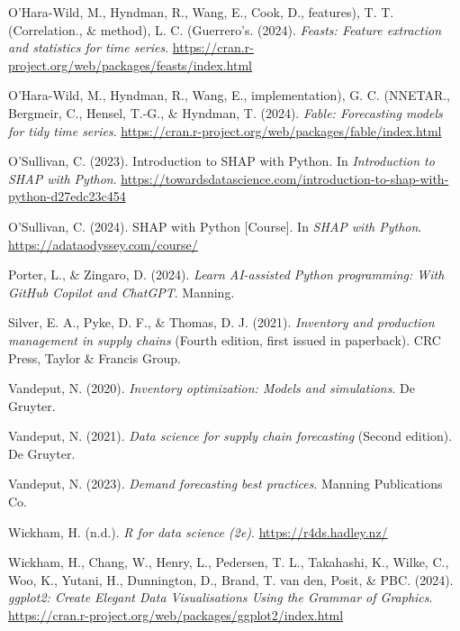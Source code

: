 \documentclass[
  american,
  10,
  a4paper,
]{book}
\newlength{\cslhangindent}
\newenvironment{CSLReferences}[2] %
 {\begin{list}{}{%
  \setlength{\itemindent}{0pt}
  \setlength{\leftmargin}{0pt}
  \setlength{\parsep}{0pt}
  \ifodd #1
   \setlength{\leftmargin}{\cslhangindent}
   \setlength{\itemindent}{-1\cslhangindent}
  \fi
  \setlength{\itemsep}{#2\baselineskip}}}
 {\end{list}}
\theoremstyle{definition}
\theoremstyle{remark}
\begin{document}
\begin{CSLReferences}{1}{0}
O'Hara-Wild, M., Hyndman, R., Wang, E., Cook, D., features), T. T.
(Correlation., \& method), L. C. (Guerrero's. (2024). \emph{Feasts:
Feature extraction and statistics for time series}.
\url{https://cran.r-project.org/web/packages/feasts/index.html}

O'Hara-Wild, M., Hyndman, R., Wang, E., implementation), G. C. (NNETAR.,
Bergmeir, C., Hensel, T.-G., \& Hyndman, T. (2024). \emph{Fable:
Forecasting models for tidy time series}.
\url{https://cran.r-project.org/web/packages/fable/index.html}

O'Sullivan, C. (2023). Introduction to {SHAP} with {Python}. In
\emph{Introduction to SHAP with Python}.
\url{https://towardsdatascience.com/introduction-to-shap-with-python-d27edc23c454}

O'Sullivan, C. (2024). {SHAP} with {Python} {[}Course{]}. In \emph{SHAP
with Python}. \url{https://adataodyssey.com/course/}

Porter, L., \& Zingaro, D. (2024). \emph{Learn {AI}-assisted {Python}
programming: With {GitHub} {Copilot} and {ChatGPT}}. Manning.

Silver, E. A., Pyke, D. F., \& Thomas, D. J. (2021). \emph{Inventory and
production management in supply chains} (Fourth edition, first issued in
paperback). CRC Press, Taylor \& Francis Group.

Vandeput, N. (2020). \emph{Inventory optimization: Models and
simulations}. De Gruyter.

Vandeput, N. (2021). \emph{Data science for supply chain forecasting}
(Second edition). De Gruyter.

Vandeput, N. (2023). \emph{Demand forecasting best practices}. Manning
Publications Co.

Wickham, H. (n.d.). \emph{R for data science (2e)}.
\url{https://r4ds.hadley.nz/}

Wickham, H., Chang, W., Henry, L., Pedersen, T. L., Takahashi, K.,
Wilke, C., Woo, K., Yutani, H., Dunnington, D., Brand, T. van den,
Posit, \& PBC. (2024). \emph{ggplot2: {Create} {Elegant} {Data}
{Visualisations} {Using} the {Grammar} of {Graphics}}.
\url{https://cran.r-project.org/web/packages/ggplot2/index.html}

\end{CSLReferences}
\end{document}
